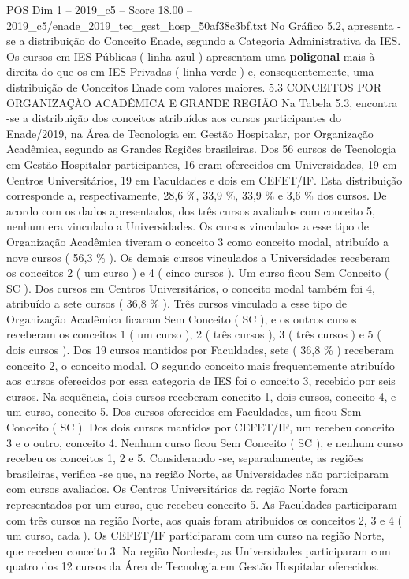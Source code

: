 \begin{textsample}{POS Dim 1 – 2019\_c5 – Score 18.00 – 2019\_c5/enade\_2019\_tec\_gest\_hosp\_50af38c3bf.txt}
No Gráfico 5.2, apresenta -se a distribuição do Conceito Enade, segundo a Categoria Administrativa da IES.
Os cursos em IES Públicas ( linha azul ) apresentam uma \textbf{poligonal} mais à direita do que os em IES Privadas ( linha verde ) e, consequentemente, uma distribuição de Conceitos Enade com valores maiores. 5.3 CONCEITOS POR ORGANIZAÇÃO ACADÊMICA E GRANDE REGIÃO Na Tabela 5.3, encontra -se a distribuição dos conceitos atribuídos aos cursos participantes do Enade/2019, na Área de Tecnologia em Gestão Hospitalar, por Organização Acadêmica, segundo as Grandes Regiões brasileiras.
Dos 56 cursos de Tecnologia em Gestão Hospitalar participantes, 16 eram oferecidos em Universidades, 19 em Centros Universitários, 19 em Faculdades e dois em CEFET/IF.
Esta distribuição corresponde a, respectivamente, 28,6 \%, 33,9 \%, 33,9 \% e 3,6 \% dos cursos.
De acordo com os dados apresentados, dos três cursos avaliados com conceito 5, nenhum era vinculado a Universidades.
Os cursos vinculados a esse tipo de Organização Acadêmica tiveram o conceito 3 como conceito modal, atribuído a nove cursos ( 56,3 \% ).
Os demais cursos vinculados a Universidades receberam os conceitos 2 ( um curso ) e 4 ( cinco cursos ).
Um curso ficou Sem Conceito ( SC ).
Dos cursos em Centros Universitários, o conceito modal também foi 4, atribuído a sete cursos ( 36,8 \% ).
Três cursos vinculado a esse tipo de Organização Acadêmica ficaram Sem Conceito ( SC ), e os outros cursos receberam os conceitos 1 ( um curso ), 2 ( três cursos ), 3 ( três cursos ) e 5 ( dois cursos ).
Dos 19 cursos mantidos por Faculdades, sete ( 36,8 \% ) receberam conceito 2, o conceito modal.
O segundo conceito mais frequentemente atribuído aos cursos oferecidos por essa categoria de IES foi o conceito 3, recebido por seis cursos.
Na sequência, dois cursos receberam conceito 1, dois cursos, conceito 4, e um curso, conceito 5.
Dos cursos oferecidos em Faculdades, um ficou Sem Conceito ( SC ).
Dos dois cursos mantidos por CEFET/IF, um recebeu conceito 3 e o outro, conceito 4.
Nenhum curso ficou Sem Conceito ( SC ), e nenhum curso recebeu os conceitos 1, 2 e 5.
Considerando -se, separadamente, as regiões brasileiras, verifica -se que, na região Norte, as Universidades não participaram com cursos avaliados.
Os Centros Universitários da região Norte foram representados por um curso, que recebeu conceito 5.
As Faculdades participaram com três cursos na região Norte, aos quais foram atribuídos os conceitos 2, 3 e 4 ( um curso, cada ).
Os CEFET/IF participaram com um curso na região Norte, que recebeu conceito 3.
Na região Nordeste, as Universidades participaram com quatro dos 12 cursos da Área de Tecnologia em Gestão Hospitalar oferecidos.

\end{textsample}

